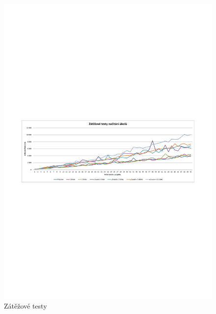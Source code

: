 \begin{figure}[h]
\begin{center}
	\includegraphics[trim=15mm 115mm 15mm 110mm, clip, width=15cm]{figures/zatezove-testy}
	\caption{Zátěžové testy}
	\label{fig:load-tests}
\end{center}
\end{figure}